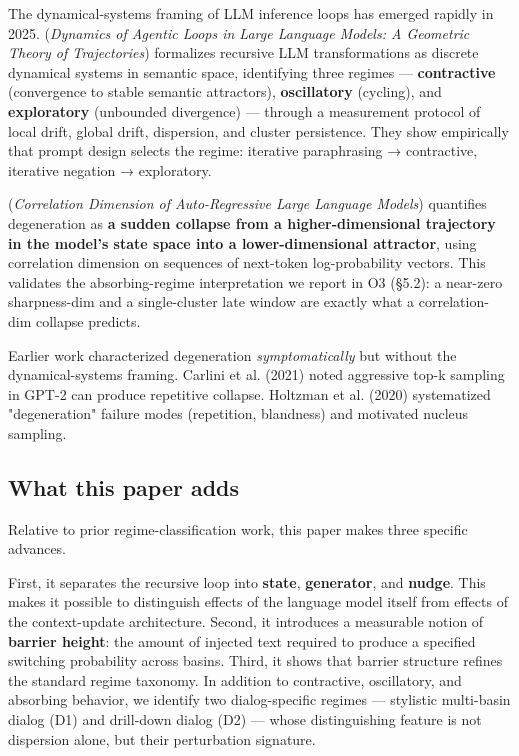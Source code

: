\documentclass{article}
\theoremstyle{plain}
\theoremstyle{definition}
\begin{document}
The dynamical-systems framing of LLM inference loops has emerged
rapidly in 2025. \citet{arxiv251210350} (\textit{Dynamics of Agentic Loops in
Large Language Models: A Geometric Theory of Trajectories})
formalizes recursive LLM transformations as discrete dynamical
systems in semantic space, identifying three regimes — \textbf{contractive}
(convergence to stable semantic attractors), \textbf{oscillatory}
(cycling), and \textbf{exploratory} (unbounded divergence) — through a
measurement protocol of local drift, global drift, dispersion, and
cluster persistence. They show empirically that prompt design selects
the regime: iterative paraphrasing → contractive, iterative negation
→ exploratory.

\citet{arxiv251021258} (\textit{Correlation Dimension of Auto-Regressive Large
Language Models}) quantifies degeneration as \textbf{a sudden collapse from
a higher-dimensional trajectory in the model's state space into a
lower-dimensional attractor}, using correlation dimension on
sequences of next-token log-probability vectors. This validates the
absorbing-regime interpretation we report in O3 (§5.2): a near-zero
sharpness-dim and a single-cluster late window are exactly what a
correlation-dim collapse predicts.

Earlier work characterized degeneration \textit{symptomatically} but without
the dynamical-systems framing. Carlini et al. (2021) noted aggressive
top-k sampling in GPT-2 can produce repetitive collapse. Holtzman et
al. (2020) systematized "degeneration" failure modes (repetition,
blandness) and motivated nucleus sampling.

\subsection{What this paper adds}

Relative to prior regime-classification work, this paper makes three
specific advances.

First, it separates the recursive loop into \textbf{state}, \textbf{generator},
and \textbf{nudge}. This makes it possible to distinguish effects of the
language model itself from effects of the context-update architecture.
Second, it introduces a measurable notion of \textbf{barrier height}: the
amount of injected text required to produce a specified switching
probability across basins. Third, it shows that barrier structure
refines the standard regime taxonomy. In addition to contractive,
oscillatory, and absorbing behavior, we identify two dialog-specific
regimes — stylistic multi-basin dialog (D1) and drill-down dialog
(D2) — whose distinguishing feature is not dispersion alone, but
their perturbation signature.
\end{document}
